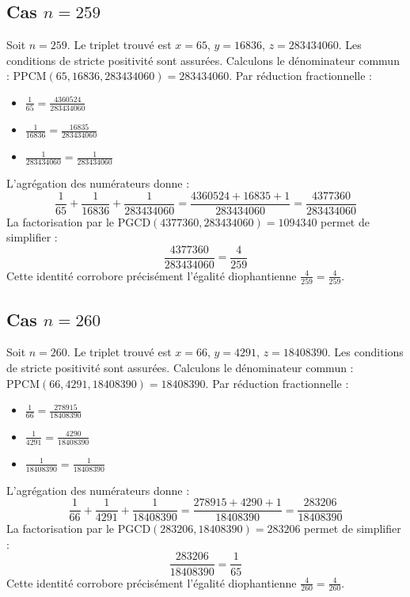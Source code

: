 \documentclass[11pt,a4paper]{article}
\begin{document}
\subsection{Cas $n = 259$}
Soit $n = 259$. Le triplet trouvé est $x = 65$, $y = 16836$, $z = 283434060$.
Les conditions de stricte positivité sont assurées.
Calculons le dénominateur commun : $\text{PPCM}(65, 16836, 283434060) = 283434060$.
Par réduction fractionnelle :
\begin{itemize}
    \item $\frac{1}{65} = \frac{4360524}{283434060}$
    \item $\frac{1}{16836} = \frac{16835}{283434060}$
    \item $\frac{1}{283434060} = \frac{1}{283434060}$
\end{itemize}
L'agrégation des numérateurs donne :
$$ \frac{1}{65} + \frac{1}{16836} + \frac{1}{283434060} = \frac{4360524 + 16835 + 1}{283434060} = \frac{4377360}{283434060} $$
La factorisation par le $\text{PGCD}(4377360, 283434060) = 1094340$ permet de simplifier :
$$ \frac{4377360}{283434060} = \frac{4}{259} $$
Cette identité corrobore précisément l'égalité diophantienne $\frac{4}{259} = \frac{4}{259}$.

\subsection{Cas $n = 260$}
Soit $n = 260$. Le triplet trouvé est $x = 66$, $y = 4291$, $z = 18408390$.
Les conditions de stricte positivité sont assurées.
Calculons le dénominateur commun : $\text{PPCM}(66, 4291, 18408390) = 18408390$.
Par réduction fractionnelle :
\begin{itemize}
    \item $\frac{1}{66} = \frac{278915}{18408390}$
    \item $\frac{1}{4291} = \frac{4290}{18408390}$
    \item $\frac{1}{18408390} = \frac{1}{18408390}$
\end{itemize}
L'agrégation des numérateurs donne :
$$ \frac{1}{66} + \frac{1}{4291} + \frac{1}{18408390} = \frac{278915 + 4290 + 1}{18408390} = \frac{283206}{18408390} $$
La factorisation par le $\text{PGCD}(283206, 18408390) = 283206$ permet de simplifier :
$$ \frac{283206}{18408390} = \frac{1}{65} $$
Cette identité corrobore précisément l'égalité diophantienne $\frac{4}{260} = \frac{4}{260}$.
\end{document}
